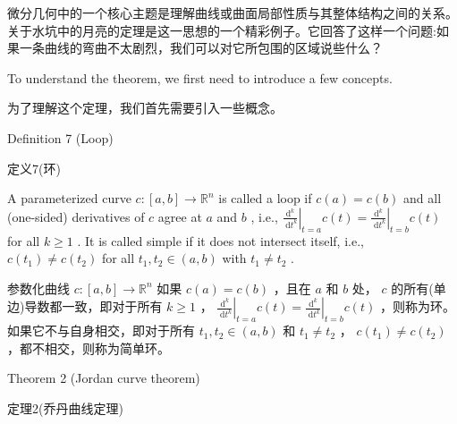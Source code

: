 \begin{tcolorbox}
微分几何中的一个核心主题是理解曲线或曲面局部性质与其整体结构之间的关系。关于水坑中的月亮的定理是这一思想的一个精彩例子。它回答了这样一个问题:如果一条曲线的弯曲不太剧烈，我们可以对它所包围的区域说些什么？
\end{tcolorbox}

To understand the theorem, we first need to introduce a few concepts.

\begin{tcolorbox}
为了理解这个定理，我们首先需要引入一些概念。
\end{tcolorbox}

\HRule

Definition 7 (Loop)

\begin{tcolorbox}
定义7(环)
\end{tcolorbox}

\HRule

A parameterized curve \(c : \left\lbrack  {a,b}\right\rbrack   \rightarrow  {\mathbb{R}}^{n}\) is called a loop if \(c\left( a\right)  = c\left( b\right)\) and all (one-sided) derivatives of \(c\) agree at \(a\) and \(b\) , i.e., \({\left. \frac{{\mathrm{d}}^{k}}{\mathrm{\;d}{t}^{k}}\right| }_{t = a}c\left( t\right)  = {\left. \frac{{\mathrm{d}}^{k}}{\mathrm{\;d}{t}^{k}}\right| }_{t = b}c\left( t\right)\) for all \(k \geq  1\) . It is called simple if it does not intersect itself, i.e., \(c\left( {t}_{1}\right)  \neq  c\left( {t}_{2}\right)\) for all \({t}_{1},{t}_{2} \in  \left( {a,b}\right)\) with \({t}_{1} \neq  {t}_{2}\) .

\begin{tcolorbox}
参数化曲线 \(c : \left\lbrack  {a,b}\right\rbrack   \rightarrow  {\mathbb{R}}^{n}\) 如果 \(c\left( a\right)  = c\left( b\right)\) ，且在 \(a\) 和 \(b\) 处， \(c\) 的所有(单边)导数都一致，即对于所有 \(k \geq  1\) ， \({\left. \frac{{\mathrm{d}}^{k}}{\mathrm{\;d}{t}^{k}}\right| }_{t = a}c\left( t\right)  = {\left. \frac{{\mathrm{d}}^{k}}{\mathrm{\;d}{t}^{k}}\right| }_{t = b}c\left( t\right)\) ，则称为环。如果它不与自身相交，即对于所有 \({t}_{1},{t}_{2} \in  \left( {a,b}\right)\) 和 \({t}_{1} \neq  {t}_{2}\) ， \(c\left( {t}_{1}\right)  \neq  c\left( {t}_{2}\right)\) ，都不相交，则称为简单环。
\end{tcolorbox}

\HRule

Theorem 2 (Jordan curve theorem)

\begin{tcolorbox}
定理2(乔丹曲线定理)
\end{tcolorbox}

